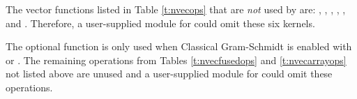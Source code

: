 The vector functions listed in Table \ref{t:nvecops} that are {\em not} used by
{\cvodes} are: , , ,
, , and . Therefore, a user-supplied
{\nvector} module for {\cvodes} could omit these six kernels.

The optional function  is only used when Classical
Gram-Schmidt is enabled with {\spgmr} or {\spfgmr}. The remaining
operations from Tables \ref{t:nvecfusedops} and \ref{t:nvecarrayops}
not listed above are unused and a user-supplied {\nvector} module for
{\cvodes} could omit these operations.
